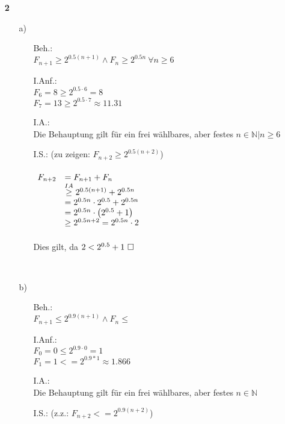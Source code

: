 \documentclass[a4paper,11pt,fleqn]{scrartcl}
\begin{document}
\begin{enumerate}
		\item[\textbf{2}]
		\begin{enumerate}
			\item[a)] \quad \\
			\begin{enumerate}
				\item[Beh.:]\quad \\
					$F_{n+1} \geq 2^{0.5(n+1)}\land F_n \geq 2^{0.5n}\ \forall n\geq 6$
				\item[I.Anf.:]\quad \\
					$F_6 = 8 \geq 2^{0.5\cdot 6} = 8$ \\
					$F_7 = 13 \geq 2^{0.5\cdot 7} \approx 11.31 $
				\item[I.A.:]\quad \\
					Die Behauptung gilt für ein frei wählbares, aber festes $n\in\mathbb{N}|n\geq 6$
				\item[I.S.:] (zu zeigen: $F_{n+2}\geq 2^{0.5(n+2)}$) \\ \\
				    \(
					\begin{array}{rl}
						F_{n+2} &= F_{n+1} +F_n \\
						& \overset{\tiny{IA}}{\geq} 2^{0.5(n+1)} + 2^{0.5n} \\
						& = 2^{0.5n} \cdot 2^{0.5} + 2^{0.5n} \\
						& = 2^{0.5n} \cdot \big(2^{0.5} + 1\big) \\
						& \geq 2^{0.5n+2} =  2^{0.5n} \cdot 2
					\end{array}
					\) \\ \\
					Dies gilt, da $2 < 2^{0.5}+1 \qed$
			\end{enumerate} \quad \\
			\newpage
			\item[b)] \quad \\
			\begin{enumerate}
				\item[Beh.:]\quad \\
					$F_{n+1} \leq 2^{0.9(n+1)}\land F_n \leq $
				\item[I.Anf.:]\quad \\
					$F_0 = 0 \leq 2^{0.9\cdot 0}  = 1 $\\ 
					$F_1 = 1 <= 2^{0.9 * 1} \approx 1.866$
				\item[I.A.:]\quad \\
					Die Behauptung gilt für ein frei wählbares, aber festes $n\in\mathbb{N}$
				\item[I.S.:] (z.z.: $F_{n + 2} <= 2^{0.9(n + 2)}$) \\ \\

\end{enumerate}
\end{enumerate}
\end{enumerate}
\end{document}
